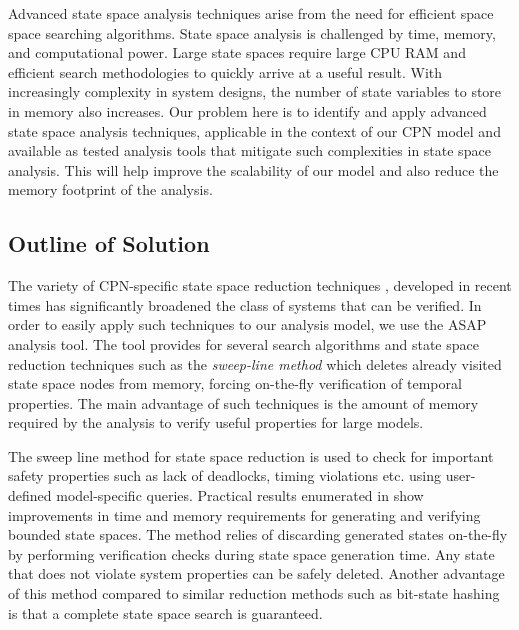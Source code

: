 Advanced state space analysis techniques arise from the need for efficient space space searching algorithms. State space analysis is challenged by time, memory, and computational power. Large state spaces require large CPU RAM and efficient search methodologies to quickly arrive at a useful result. With increasingly complexity in system designs, the number of state variables to store in memory also increases. Our problem here is to identify and apply advanced state space analysis techniques, applicable in the context of our CPN model and available as tested analysis tools that mitigate such complexities in state space analysis. This will help improve the scalability of our model and also reduce the memory footprint of the analysis. 

\subsection{Outline of Solution}

The variety of CPN-specific state space reduction techniques \cite{CPN_Sweepline}, \cite{CPN_Symmetry} developed in recent times has significantly broadened the class of systems that can be verified. In order to easily apply such techniques to our analysis model, we use the ASAP \cite{ASAP} analysis tool. The tool provides for several search algorithms and state space reduction techniques such as the \emph{sweep-line method} \cite{Christensen2001} which deletes already visited state space nodes from memory, forcing on-the-fly verification of temporal properties. The main advantage of such techniques is the amount of memory required by the analysis to verify useful properties for large models. 

The sweep line method for state space reduction is used to check for important safety properties such as lack of deadlocks, timing violations etc. using user-defined model-specific queries. Practical results enumerated in \cite{Christensen2001} show improvements in time and memory requirements for generating and verifying bounded state spaces. The method relies of discarding generated states on-the-fly by performing verification checks during state space generation time. Any state that does not violate system properties can be safely deleted. Another advantage of this method compared to similar reduction methods such as bit-state hashing \cite{CPN_Bitstate_Hashing} is that a complete state space search is guaranteed. 

